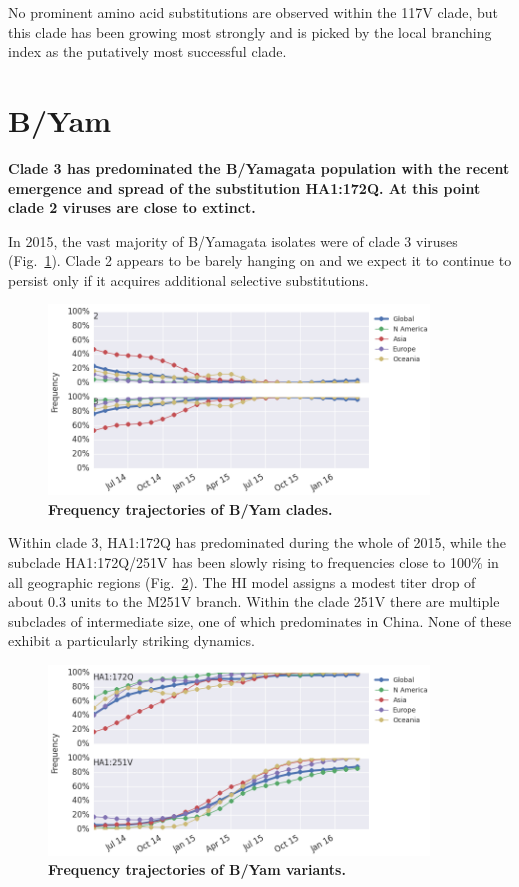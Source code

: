 \documentclass[11pt,oneside,letterpaper]{article}
\begin{document}
No prominent amino acid substitutions are observed within the 117V clade, but this clade has been growing most strongly and is picked by the local branching index \cite{neher2014predicting} as the putatively most successful clade.

\clearpage
\pagebreak

\section*{B/Yam}

\textbf{Clade 3 has predominated the B/Yamagata population with the recent emergence and spread of the substitution HA1:172Q. At this point clade 2 viruses are close to extinct.}

In 2015, the vast majority of B/Yamagata isolates were of clade 3 viruses (Fig.\ \ref{Yam_clades}). Clade 2 appears to be barely hanging on and we expect it to continue to persist only if it acquires additional selective substitutions.

\begin{figure}[h!]
	\centering		
	\includegraphics[width=0.9\textwidth]{../figures/feb-2016/Yam_clades.png}
	\caption{\textbf{Frequency trajectories of B/Yam clades.} 
	}
	\label{Yam_clades}
\end{figure}

\pagebreak

Within clade 3, HA1:172Q has predominated during the whole of 2015, while the subclade HA1:172Q/251V has been slowly rising to frequencies close to 100\% in all geographic regions (Fig.\ \ref{Yam_mutations}). The HI model \cite{neher2015prediction} assigns a modest titer drop of about 0.3 units to the M251V branch. Within the clade 251V there are multiple subclades of intermediate size, one of which predominates in China. None of these exhibit a particularly striking dynamics.

\begin{figure}[h!]
	\centering		
	\includegraphics[width=0.9\textwidth]{../figures/feb-2016/Yam_mutations.png}
	\caption{\textbf{Frequency trajectories of B/Yam variants.} 
	}
	\label{Yam_mutations}
\end{figure}



\end{document}
